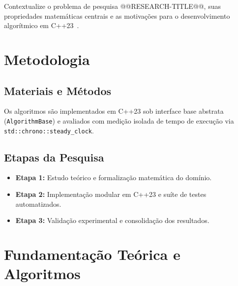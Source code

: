 \documentclass[12pt,a4paper]{article}
\begin{document}
Contextualize o problema de pesquisa @@RESEARCH-TITLE@@, suas propriedades matemáticas centrais e as motivações para o desenvolvimento algorítmico em C++23~\cite{cormen2022introduction, korte2018combinatorial}.

\clearpage

\section{Metodologia}\label{sec:metodologia}

\subsection{Materiais e Métodos}
Os algoritmos são implementados em C++23 sob interface base abstrata (\lstinline{AlgorithmBase}) e avaliados com medição isolada de tempo de execução via \lstinline{std::chrono::steady_clock}.

\subsection{Etapas da Pesquisa}
\begin{itemize}[leftmargin=1.5em, itemsep=0.1em, topsep=0.15em, parsep=0em]
    \item \textbf{Etapa 1:} Estudo teórico e formalização matemática do domínio.
    \item \textbf{Etapa 2:} Implementação modular em C++23 e suíte de testes automatizados.
    \item \textbf{Etapa 3:} Validação experimental e consolidação dos resultados.
\end{itemize}

\clearpage

\section{Fundamentação Teórica e Algoritmos}\label{sec:fundamentacao}
\end{document}
